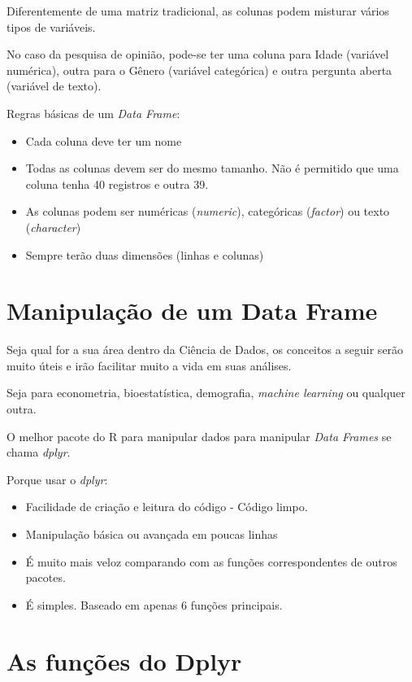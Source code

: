 \documentclass[
]{book}
\providecommand{\tightlist}{%
  \setlength{\itemsep}{0pt}\setlength{\parskip}{0pt}}
\begin{document}
Diferentemente de uma matriz tradicional, as colunas podem misturar
vários tipos de variáveis.

No caso da pesquisa de opinião, pode-se ter uma coluna para Idade
(variável numérica), outra para o Gênero (variável categórica) e outra
pergunta aberta (variável de texto).

Regras básicas de um \emph{Data Frame}:

\begin{itemize}
\tightlist
\item
  Cada coluna deve ter um nome
\item
  Todas as colunas devem ser do mesmo tamanho. Não é permitido que uma
  coluna tenha 40 registros e outra 39.
\item
  As colunas podem ser numéricas (\emph{numeric}), categóricas
  (\emph{factor}) ou texto (\emph{character})
\item
  Sempre terão duas dimensões (linhas e colunas)
\end{itemize}

\hypertarget{manipulauxe7uxe3o-de-um-data-frame}{%
\section{Manipulação de um Data
Frame}\label{manipulauxe7uxe3o-de-um-data-frame}}

Seja qual for a sua área dentro da Ciência de Dados, os conceitos a
seguir serão muito úteis e irão facilitar muito a vida em suas análises.

Seja para econometria, bioestatística, demografia, \emph{machine
learning} ou qualquer outra.

O melhor pacote do R para manipular dados para manipular \emph{Data
Frames} se chama \emph{dplyr}.

Porque usar o \emph{dplyr}:

\begin{itemize}
\item
  Facilidade de criação e leitura do código - Código limpo.
\item
  Manipulação básica ou avançada em poucas linhas
\item
  É muito mais veloz comparando com as funções correspondentes de outros
  pacotes.
\item
  É simples. Baseado em apenas 6 funções principais.
\end{itemize}

\hypertarget{as-funuxe7uxf5es-do-dplyr}{%
\section{As funções do Dplyr}\label{as-funuxe7uxf5es-do-dplyr}}
\end{document}
